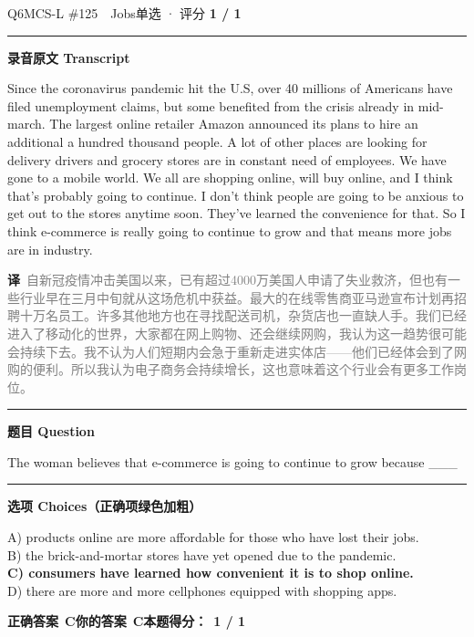 \documentclass[11pt]{article}
\newcommand{\ptesub}[1]{%
  \par\needspace{2\baselineskip}\smallskip
  {\color{cAccent}\rule[-0.2ex]{3pt}{1.05em}}\hspace{6pt}%
  {\bfseries\color{cHead}#1}\par\nopagebreak\smallskip}
\newcommand{\zh}[1]{{\footnotesize\textcolor{cNote}{\textbf{译}}\ \textcolor{gray}{#1}}}
\begin{document}
\begin{qblock}{Q6\quad MCS-L \#125\ \ Jobs}{单选 · 评分 \textcolor{cAccent}{\bfseries 1 / 1}}
\ptesub{录音原文 Transcript}
\begin{promptbox}
Since the coronavirus pandemic hit the U.S, over 40 millions of Americans have filed unemployment claims, but some benefited from the crisis already in mid-march. The largest online retailer Amazon announced its plans to hire an additional a hundred thousand people. A lot of other places are looking for delivery drivers and grocery stores are in constant need of employees. We have gone to a mobile world. We all are shopping online, will buy online, and I think that's probably going to continue. I don't think people are going to be anxious to get out to the stores anytime soon. They've learned the convenience for that. So I think e-commerce is really going to continue to grow and that means more jobs are in industry.
\end{promptbox}
\zh{自新冠疫情冲击美国以来，已有超过4000万美国人申请了失业救济，但也有一些行业早在三月中旬就从这场危机中获益。最大的在线零售商亚马逊宣布计划再招聘十万名员工。许多其他地方也在寻找配送司机，杂货店也一直缺人手。我们已经进入了移动化的世界，大家都在网上购物、还会继续网购，我认为这一趋势很可能会持续下去。我不认为人们短期内会急于重新走进实体店——他们已经体会到了网购的便利。所以我认为电子商务会持续增长，这也意味着这个行业会有更多工作岗位。}
\ptesub{题目 Question}
\begin{notebox}The woman believes that e-commerce is going to continue to grow because \_\_\_\end{notebox}
\ptesub{选项 Choices（正确项绿色加粗）}
{\small
A) products online are more affordable for those who have lost their jobs.\\
B) the brick-and-mortar stores have yet opened due to the pandemic.\\
{\color{cFix}\textbf{C) consumers have learned how convenient it is to shop online.}}\\
D) there are more and more cellphones equipped with shopping apps.}
\par\smallskip
\textbf{正确答案}\ \textcolor{cFix}{\bfseries C}\qquad\textbf{你的答案}\ \textcolor{cFix}{\bfseries C}\qquad\textbf{本题得分：}\ {\color{cAccent}\bfseries 1 / 1}
\end{qblock}
\end{document}
